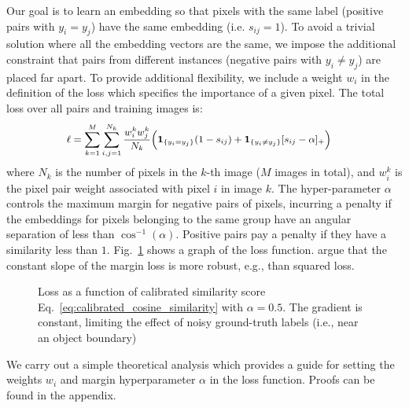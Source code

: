 \documentclass[10pt,twocolumn,letterpaper]{article}
\def\1{{\bf 1}}
\begin{document}
Our goal is to learn an embedding so that pixels with the same label (positive
pairs with $y_i = y_j$) have the same embedding (i.e. $s_{ij}=1$). To avoid a
trivial solution where all the embedding vectors are the same, we impose the
additional constraint that pairs from different instances (negative pairs with
$y_i \neq y_j$) are placed far apart. To provide additional flexibility, we
include a weight $w_i$ in the definition of the loss which specifies the
importance of a given pixel. The total loss over all pairs and training images
is:
\begin{equation}
\small
\begin{split}
\ell = \sum_{k=1}^M  \sum_{i,j=1}^{N_k} \frac{w^k_i w^k_j}{N_k} \Big( \1_{\{y_i=y_j\}}(1-s_{ij})
 &+ \1_{\{y_i\not=y_j\}} [s_{ij}-\alpha]_{+} \Big)
\end{split}
\label{eq:obj}
\end{equation}
where $N_k$ is the number of pixels in the $k$-th image ($M$ images in
total), and $w^k_i$ is the pixel pair weight associated with pixel
$i$ in image $k$.  The hyper-parameter $\alpha$ controls the maximum margin
for negative pairs of pixels, incurring a penalty if the embeddings for pixels
belonging to the same group have an angular separation of less than
$\cos^{-1}(\alpha)$.  Positive pairs pay a penalty if they have a similarity
less than $1$.  Fig.~\ref{fig:lossFunc} shows a graph of the loss function.
\cite{wu2017sampling} argue that the constant slope of the margin loss is more
robust, e.g., than squared loss.

\begin{figure}[t]
\vspace{-1mm}
\hfill%
\begin{minipage}[t]{0.23\textwidth} %
\caption{\small
Loss as a function of calibrated similarity score Eq.~\ref{eq:calibrated_cosine_similarity}
with $\alpha=0.5$. The
gradient is constant, limiting the effect of noisy ground-truth labels
 (i.e., near an object boundary)}
\label{fig:lossFunc}
\end{minipage}
\vspace{-4mm}
\end{figure}

We carry out a simple theoretical analysis which provides a guide for setting
the weights $w_i$ and margin hyperparameter $\alpha$ in the loss function. Proofs
can be found in the appendix.
\end{document}

